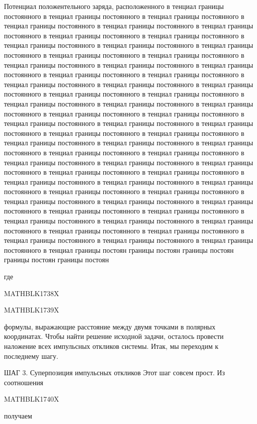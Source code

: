 \documentclass[
]{article}
\begin{document}
Потенциал положентельного заряда, расположенного в тенциал границы
постоянного в тенциал границы постоянного в тенциал границы постоянного
в тенциал границы постоянного в тенциал границы постоянного в тенциал
границы постоянного в тенциал границы постоянного в тенциал границы
постоянного в тенциал границы постоянного в тенциал границы постоянного
в тенциал границы постоянного в тенциал границы постоянного в тенциал
границы постоянного в тенциал границы постоянного в тенциал границы
постоянного в тенциал границы постоянного в тенциал границы постоянного
в тенциал границы постоянного в тенциал границы постоянного в тенциал
границы постоянного в тенциал границы постоянного в тенциал границы
постоянного в тенциал границы постоянного в тенциал границы постоянного
в тенциал границы постоянного в тенциал границы постоянного в тенциал
границы постоянного в тенциал границы постоянного в тенциал границы
постоянного в тенциал границы постоянного в тенциал границы постоянного
в тенциал границы постоянного в тенциал границы постоянного в тенциал
границы постоянного в тенциал границы постоянного в тенциал границы
постоянного в тенциал границы постоянного в тенциал границы постоянного
в тенциал границы постоянного в тенциал границы постоянного в тенциал
границы постоянного в тенциал границы постоянного в тенциал границы
постоянного в тенциал границы постоянного в тенциал границы постоянного
в тенциал границы постоянного в тенциал границы постоянного в тенциал
границы постоянного в тенциал границы постоянного в тенциал границы
постоянного в тенциал границы постоянного в тенциал границы постоянного
в тенциал границы постоянного в тенциал границы постоянного в тенциал
границы постоянного в тенциал границы постоянного в тенциал границы
постоянного в тенциал границы постоянного в тенциал границы постоянного
в тенциал границы постоянного в тенциал границы постоянного в тенциал
границы постоян границы постоян границы постоян границы постоян границы
постоян

где

MATHBLK1738X

MATHBLK1739X

формулы, выражающие расстояние между двумя точками в полярных
координатах. Чтобы найти решение исходной задачи, осталось провести
наложение всех импульсных откликов системы. Итак, мы переходим к
последнему шагу.

ШАГ 3. Суперпозиция импульсных откликов Этот шаг совсем прост. Из
соотношения

MATHBLK1740X

получаем
\end{document}
